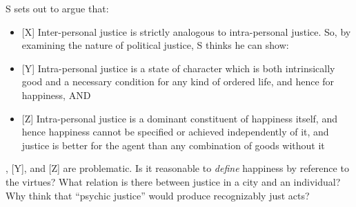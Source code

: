 \documentclass[11pt]{article}
\begin{document}
\noindent S sets out to argue that:
\begin{itemize}\item{[X] Inter-personal justice is strictly analogous to intra-personal justice. So, by examining the nature of political justice, S thinks he can show:}\item{[Y] Intra-personal justice is a state of character which is both intrinsically good and a necessary condition for any kind of ordered life, and hence for happiness, AND}\item{[Z] Intra-personal justice is a dominant constituent of happiness itself, and hence happiness cannot be specified or achieved independently of it, and justice is better for the agent than any combination of goods without it}\end{itemize}

\noindent [X], [Y], and [Z] are problematic. Is it reasonable to \emph{define} happiness by reference to the virtues? What relation is there between justice in a city and an individual? Why think that ``psychic justice'' would produce recognizably just acts?
\end{document}

